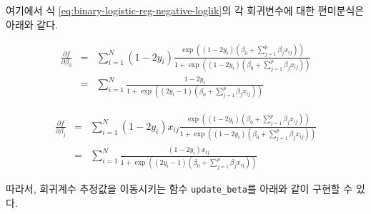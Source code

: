 \documentclass[
]{book}
\begin{document}
여기에서 식 \eqref{eq:binary-logistic-reg-negative-loglik}의 각 회귀변수에 대한 편미분식은 아래와 같다.

\begin{eqnarray*}
\frac{\partial f}{\partial \beta_0} &=& \sum_{i = 1}^{N} (1 - 2y_i) \frac{\exp\left((1 - 2y_i)(\beta_0 + \sum_{j = 1}^{p} \beta_j x_{ij})\right)}{1 + \exp\left((1 - 2y_i)(\beta_0 + \sum_{j = 1}^{p} \beta_j x_{ij})\right)}\\
&=& \sum_{i = 1}^{N} \frac{1 - 2y_i}{1 + \exp\left((2y_i - 1)(\beta_0 + \sum_{j = 1}^{p} \beta_j x_{ij})\right)}
\end{eqnarray*}

\begin{eqnarray*}
\frac{\partial f}{\partial \beta_j} &=& \sum_{i = 1}^{N} (1 - 2y_i)x_{ij} \frac{\exp\left((1 - 2y_i)(\beta_0 + \sum_{j = 1}^{p} \beta_j x_{ij})\right)}{1 + \exp\left((1 - 2y_i)(\beta_0 + \sum_{j = 1}^{p} \beta_j x_{ij})\right)}\\
&=& \sum_{i = 1}^{N} \frac{(1 - 2y_i)x_{ij}}{1 + \exp\left((2y_i - 1)(\beta_0 + \sum_{j = 1}^{p} \beta_j x_{ij})\right)}
\end{eqnarray*}

따라서, 회귀계수 추정값을 이동시키는 함수 \texttt{update\_beta}를 아래와 같이 구현할 수 있다.
\end{document}
